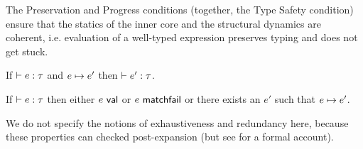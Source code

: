 {{{{The Preservation and Progress conditions (together, the {Type Safety} condition) ensure that the statics of the inner core and the structural dynamics are coherent, i.e. evaluation of a well-typed expression preserves typing and does not get stuck.
\begin{condition}[Preservation]\label{condition:preservation-UP} If $\vdash e : \tau$ and $e \mapsto e'$ then $\vdash e' : \tau$. \end{condition}
\begin{condition}[Progress]\label{condition:progress-UP} If $\vdash e : \tau$ then either $e~\mathsf{val}$ or $e~\mathsf{matchfail}$ or there exists an $e'$ such that $e \mapsto e'$. \end{condition}

We do not specify the notions of exhaustiveness and redundancy here, because these properties can checked post-expansion (but see \cite{pfple1} for a formal account).


}}}}

